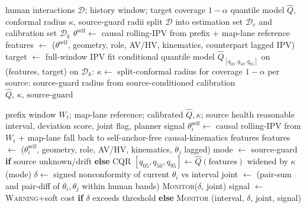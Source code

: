\documentclass[12pt,a4paper]{article}
\begin{document}
\begin{algorithm}[t]
\caption{Offline calibration of the self-anchored reasonable interval}
\label{alg:calib}
\begin{algorithmic}[1]
\REQUIRE human interactions $\mathcal{D}$; history window; target coverage $1-\alpha$
\ENSURE quantile model $\hat{Q}$, conformal radius $\kappa$, source-guard radii
\STATE split $\mathcal{D}$ into estimation set $\mathcal{D}_e$ and calibration set $\mathcal{D}_k$
    \STATE $\theta^{\mathrm{self}}\leftarrow$ causal rolling-IPV from prefix + map-lane reference
    \STATE features $\leftarrow$ ($\theta^{\mathrm{self}}$, geometry, role, AV/HV, kinematics, counterpart lagged IPV) 
    \STATE target $\leftarrow$ full-window IPV
\ENDFOR
\STATE fit conditional quantile model $\hat{Q}_{[q_{05},q_{50},q_{95}]}$ on (features, target)
\STATE on $\mathcal{D}_k$: $\kappa\leftarrow$ split-conformal radius for coverage $1-\alpha$
\STATE per source: source-guard radius from source-conditioned calibration
\RETURN $\hat{Q},\,\kappa,\,\text{source-guard}$
\end{algorithmic}
\end{algorithm}

\begin{algorithm}[t]
\caption{Online social-compliance verification step at time $t$}
\label{alg:online}
\begin{algorithmic}[1]
\REQUIRE prefix window $W_t$; map-lane reference; calibrated $\hat{Q},\kappa$; source health
\ENSURE reasonable interval, deviation score, joint flag, planner signal
    \STATE $\theta^{\mathrm{self}}_i\leftarrow$ causal rolling-IPV from $W_t$ + map-lane 
\ELSE
    \STATE fall back to self-anchor-free causal-kinematics features 
\ENDIF
\STATE features $\leftarrow$ ($\theta^{\mathrm{self}}_i$, geometry, role, AV/HV, kinematics, $\theta_j$ lagged) 
\STATE mode $\leftarrow$ source-guard \textbf{if} source unknown/drift \textbf{else} CQR
\STATE $[q_{05},q_{50},q_{95}]\leftarrow \hat{Q}(\text{features})$ widened by $\kappa$(mode) 
\STATE $\delta\leftarrow$ signed nonconformity of current $\theta_i$ vs interval
\STATE joint $\leftarrow$ (pair-sum and pair-diff of $\theta_i,\theta_j$ within human bands)
    \RETURN \textsc{Monitor}($\delta$, joint)
\ENDIF
\STATE signal $\leftarrow$ \textsc{Warning}+soft cost \textbf{if} $\delta$ exceeds threshold \textbf{else} \textsc{Monitor}
\RETURN (interval, $\delta$, joint, signal)
\end{algorithmic}
\end{algorithm}
\end{document}
